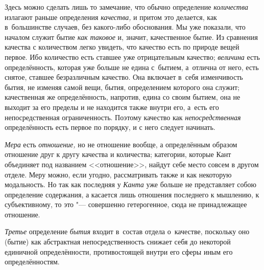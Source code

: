 Здесь можно сделать лишь то замечание, что обычно определение {\em количества}
излагают раньше определения {\em качества,} и притом это делается, как
в~большинстве случаев, без какого-либо обоснования. Мы уже показали, что
началом служит бытие {\em как таковое} и, значит, качественное бытие. Из
сравнения качества с количеством легко увидеть, что качество есть по природе
вещей первое. Ибо количество есть ставшее уже отрицательным качество;
{\em величина} есть определённость, которая уже больше не едина с~бытием,
а~отлична от него, есть снятое, ставшее безразличным качество. Она включает
в~себя изменчивость бытия, не изменяя самой вещи, бытия, определением которого
она служит; качественная же определённость, напротив, едина со своим бытием,
она не выходит за его пределы и не находится также внутри его, а~есть его
непосредственная ограниченность. Поэтому качество как {\em непосредственная}
определённость есть первое по порядку, и с него следует начинать.

{\em Мера} есть {\em отношение,} но не отношение вообще, а определённым образом
отношение друг к другу качества и количества; категории, которые Кант
объединяет под названием <<отношение>>, найдут себе место совсем в другом
отделе. Меру можно, если угодно, рассматривать также и как некоторую
модальность. Но так как последняя у {\em Канта} уже больше не представляет
собою определение содержания, а касается лишь отношения последнего к мышлению,
к субъективному, то это "--- совершенно гетерогенное, сюда не принадлежащее
отношение.

{\em Третье} определение {\em бытия} входит в~состав отдела о~качестве,
поскольку оно (бытие) как абстрактная непосредственность снижает себя до
некоторой единичной определённости, противостоящей внутри его сферы иным
его определённостям.

\bigskip
